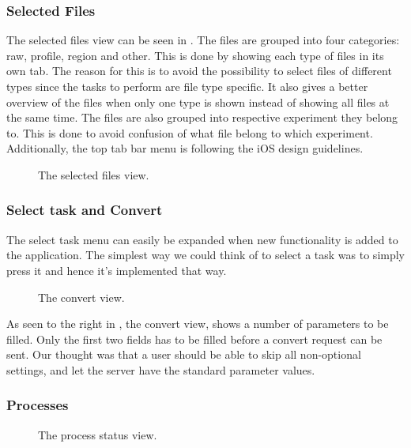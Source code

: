 \subsubsection{Selected Files}
The selected files view can be seen in . The files are grouped into four categories: raw, profile, region and other. This is done by showing each type of files in its own tab. The reason for this is to avoid the possibility to select files of different types since the tasks to perform are file type specific. It also gives a better overview of the files when only one type is shown instead of showing all files at the same time. The files are also grouped into respective experiment they belong to. This is done to avoid confusion of what file belong to which experiment. Additionally, the top tab bar menu is following the iOS design guidelines.

\begin{figure}[ht]
\caption{The selected files view.}
\label{fig:ios_selectedFiles2}
\end{figure}
\FloatBarrier

\subsubsection{Select task and Convert}
The select task menu can easily be expanded when new functionality is added to the application. The simplest way we could think of to select a task was to simply press it and hence it's implemented that way.
\begin{figure}[ht]
\caption{The convert view.}
\label{fig:ios_convertParameters}
\end{figure}
\FloatBarrier

As seen to the right in , the convert view, shows a number of parameters to be filled. Only the first two fields has to be filled before a convert request can be sent. Our thought was that a user should be able to skip all non-optional settings, and let the server have the standard parameter values. 


\subsubsection{Processes}
\begin{figure}[ht]
\caption{The process status view.}
\label{fig:ios_processingStatus}
\end{figure}
\FloatBarrier

